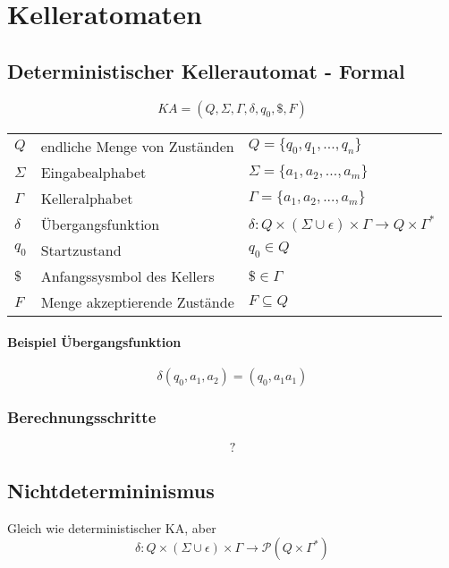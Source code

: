 
\section{Kelleratomaten}
%
\subsection{Deterministischer Kellerautomat - Formal}
\[
KA = (Q, \Sigma, \Gamma,\delta, q_0, \$, F)
\]
\begin{tabular}{lll}
	\(Q\)		& endliche Menge von Zuständen	& \(Q=\{q_0,q_1,...,q_n\}\)\\
	\(\Sigma\)	& Eingabealphabet				& \(\Sigma = \{a_1,a_2,...,a_m\}\)\\
	\(\Gamma\)	& Kelleralphabet				& \(\Gamma = \{a_1,a_2,...,a_m\}\)\\
	\(\delta\)	& Übergangsfunktion				& \(\delta: Q \times (\Sigma \cup \epsilon) \times \Gamma \rightarrow Q \times \Gamma^*\)\\
	\(q_0\)		& Startzustand					& \(q_0 \in Q\)\\
	\(\$\)		& Anfangssysmbol des Kellers	& \(\$ \in \Gamma\)\\
	\(F\)		& Menge akzeptierende Zustände	& \(F \subseteq Q\) \\
\end{tabular}

\paragraph{Beispiel Übergangsfunktion}
\[
	\delta (q_0,a_1,a_2) = (q_0,a_1 a_1)
\]

\subsubsection{Berechnungsschritte}
\[
	?
\]

\subsection{Nichtdetermininismus}
Gleich wie deterministischer KA, aber
\[
\delta: Q \times (\Sigma \cup \epsilon) \times \Gamma \rightarrow \mathcal{P}(Q \times \Gamma^*)
\]